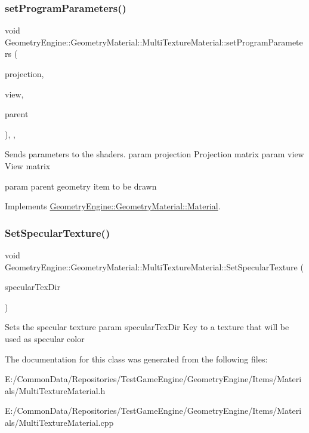 \subsubsection{\texorpdfstring{setProgramParameters()}{setProgramParameters()}}
{\footnotesize\ttfamily void Geometry\+Engine\+::\+Geometry\+Material\+::\+Multi\+Texture\+Material\+::set\+Program\+Parameters (\begin{DoxyParamCaption}\item[{const Q\+Matrix4x4 \&}]{projection,  }\item[{const Q\+Matrix4x4 \&}]{view,  }\item[{const \mbox{\hyperlink{class_geometry_engine_1_1_geometry_world_item_1_1_geometry_item_1_1_geometry_item}{Geometry\+World\+Item\+::\+Geometry\+Item\+::\+Geometry\+Item}} \&}]{parent }\end{DoxyParamCaption})\hspace{0.3cm}{\ttfamily [override]}, {\ttfamily [protected]}, {\ttfamily [virtual]}}

Sends parameters to the shaders. param projection Projection matrix param view View matrix

param parent geometry item to be drawn 

Implements \mbox{\hyperlink{class_geometry_engine_1_1_geometry_material_1_1_material_a68310797df53062f237d0005fbcfce7e}{Geometry\+Engine\+::\+Geometry\+Material\+::\+Material}}.

\mbox{\label{class_geometry_engine_1_1_geometry_material_1_1_multi_texture_material_a0b4cf7c8265e633210bc39b5e7d31f1d}} 
\subsubsection{\texorpdfstring{SetSpecularTexture()}{SetSpecularTexture()}}
{\footnotesize\ttfamily void Geometry\+Engine\+::\+Geometry\+Material\+::\+Multi\+Texture\+Material\+::\+Set\+Specular\+Texture (\begin{DoxyParamCaption}\item[{const std\+::string \&}]{specular\+Tex\+Dir }\end{DoxyParamCaption})}

Sets the specular texture param specular\+Tex\+Dir Key to a texture that will be used as specular color 

The documentation for this class was generated from the following files\+:\begin{DoxyCompactItemize}
\item 
E\+:/\+Common\+Data/\+Repositories/\+Test\+Game\+Engine/\+Geometry\+Engine/\+Items/\+Materials/Multi\+Texture\+Material.\+h\item 
E\+:/\+Common\+Data/\+Repositories/\+Test\+Game\+Engine/\+Geometry\+Engine/\+Items/\+Materials/Multi\+Texture\+Material.\+cpp\end{DoxyCompactItemize}
